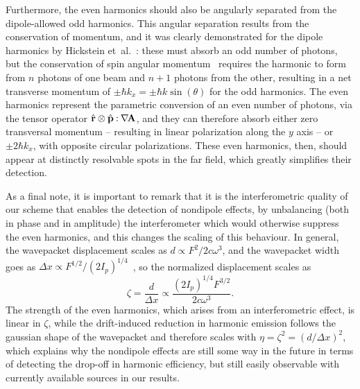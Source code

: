 Furthermore, the even harmonics should also be angularly separated from the dipole-allowed odd harmonics. This angular separation results from the conservation of momentum, and it was clearly demonstrated for the dipole harmonics by Hickstein \mbox{et al.}~\cite{hickstein_non-collinear_2015}: these must absorb an odd number of photons, but the conservation of spin angular momentum~\cite{fleischer_spin_2014, Pisanty_spin_conservation_2014} requires the harmonic to form from $n$ photons of one beam and $n+1$ photons from the other, resulting in a net transverse momentum of $\pm\hbar k_x = \pm\hbar k\sin(\theta)$ for the odd harmonics. The even harmonics represent the parametric conversion of an even number of photons, via the tensor operator $\hat{\vb{r}}\otimes\hat{\vb{p}} \mathbin{:} \nabla \hspace{-0.15em} \vb{A}$, and they can therefore absorb either zero transversal momentum -- resulting in linear polarization along the $y$ axis -- or $\pm2\hbar k_x$, with opposite circular polarizations. These even harmonics, then, should appear at distinctly resolvable spots in the far field, which greatly simplifies their detection.

As a final note, it is important to remark that it is the interferometric quality of our scheme that enables the detection of nondipole effects, by unbalancing (both in phase and in amplitude) the interferometer which would otherwise suppress the even harmonics, and this changes the scaling of this behaviour. In general, the wavepacket displacement scales as
$d \propto {F^2}/{2c\omega^3}$,
and the wavepacket width goes as 
$\Delta x \propto {F^{1/2}}/{(2I_p)^{1/4}}$~\cite{hatsagortsyan_laser_driven_2008},
so the normalized displacement scales as 
\begin{equation}
\zeta=\frac{d}{\Delta x}\propto \frac{(2I_p)^{1/4}F^{3/2}}{2c\omega^3}.
\end{equation}
The strength of the even harmonics, which arises from an interferometric effect, is linear in $\zeta$, while the drift-induced reduction in harmonic emission follows the gaussian shape of the wavepacket and therefore scales with $\eta=\zeta^2=(d/\Delta x)^2$, which explains why the nondipole effects are still some way in the future in terms of detecting the drop-off in harmonic efficiency, but still easily observable with currently available sources in our results.









